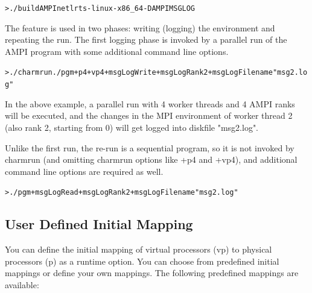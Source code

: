 \documentclass[10pt]{article}
\begin{document}
\begin{alltt}
> ./build AMPI netlrts-linux-x86_64 -DAMPIMSGLOG
\end{alltt}

The feature is used in two phases: writing (logging) the environment and
repeating the run. The first logging phase is invoked by a parallel run of the
AMPI program with some additional command line options. 

\begin{alltt}
> ./charmrun ./pgm +p4 +vp4 +msgLogWrite +msgLogRank 2 +msgLogFilename "msg2.log"
\end{alltt}

In the above example, a parallel run with 4 worker threads and 4 AMPI ranks will be
executed, and the changes in the MPI environment of worker thread 2 (also rank 2,
starting from 0) will get logged into diskfile "msg2.log". 

Unlike the first run, the re-run is a sequential program, so it is not invoked
by charmrun (and omitting charmrun options like +p4 and +vp4), and additional
command line options are required as well. 

\begin{alltt}
> ./pgm +msgLogRead +msgLogRank 2 +msgLogFilename "msg2.log"
\end{alltt}

\subsection{User Defined Initial Mapping}
                                                                                
You can define the initial mapping of virtual processors (vp) to physical
processors (p) as a runtime option. You can choose from predefined initial
mappings or define your own mappings. The following predefined mappings are
available:
                                                                                
\end{document}
